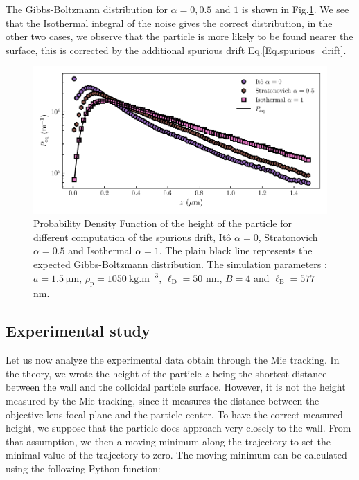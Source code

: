 The Gibbs-Boltzmann distribution for $\alpha = 0 , 0.5 \text{ and } 1 $ is shown in Fig.\ref{fig.pdf_vs_alpha}. We see that the Isothermal integral of the noise gives the correct distribution, in the other two cases, we observe that the particle is more likely to be found nearer the surface, this is corrected by the additional spurious drift Eq.\ref{Eq.spurious_drift}.

\begin{figure}[h!]
	\centering
	\includegraphics{02_body/chapter3/images/simulation_confined_Brownian_motion/Peq_vs_alpha.pdf}
	\caption{Probability Density Function of the height of the particle for different computation of the spurious drift, Itô $\alpha = 0$, Stratonovich $\alpha = 0.5$ and Isothermal $\alpha = 1$. The plain black line represents the expected Gibbs-Boltzmann distribution. The simulation parameters : $a = 1.5 ~ \mathrm{\mu m}$, $\rho_\mathrm{p} = 1050 ~\mathrm{kg.m^{-3}}$, $\ell_\mathrm{D} = 50$ nm, $B = 4$ and $\ell_\mathrm{B} = 577$ nm. }
	\label{fig.pdf_vs_alpha}
\end{figure}


\subsection{Experimental study}
\label{section:expresults}
Let us now analyze the experimental data obtain through the Mie tracking. In the theory, we wrote the height of the particle $z$ being the shortest distance between the wall and the colloidal particle surface. However, it is not the height measured by the Mie tracking, since it measures the distance between the objective lens focal plane and the particle center. To have the correct measured height, we suppose that the particle does approach very closely to the wall. From that assumption, we then a moving-minimum along the trajectory to set the minimal value of the trajectory to zero. The moving minimum can be calculated using the following Python function:



